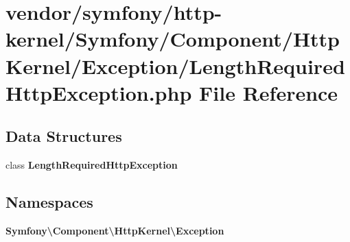 \section{vendor/symfony/http-\/kernel/\+Symfony/\+Component/\+Http\+Kernel/\+Exception/\+Length\+Required\+Http\+Exception.php File Reference}
\label{_length_required_http_exception_8php}
\subsection*{Data Structures}
\begin{DoxyCompactItemize}
\item 
class {\bf Length\+Required\+Http\+Exception}
\end{DoxyCompactItemize}
\subsection*{Namespaces}
\begin{DoxyCompactItemize}
\item 
 {\bf Symfony\textbackslash{}\+Component\textbackslash{}\+Http\+Kernel\textbackslash{}\+Exception}
\end{DoxyCompactItemize}
